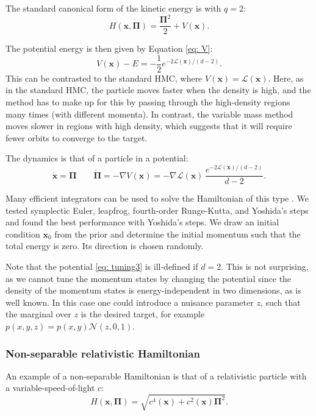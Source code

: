 \documentclass[twoside,11pt]{article}
\newcommand{\p}{\boldsymbol{\Pi}}
\newcommand{\x}{\boldsymbol{x}}
\begin{document}
The standard canonical form of the kinetic energy is with $q = 2$:
\begin{equation}\label{eq: H3}
    H(\x , \p) = \frac{\p^2}{2} + V(\x) .
\end{equation}

The potential energy is then given by Equation \eqref{eq: V}:
\begin{equation}\label{eq: tuning3}
    V(\x) - E = -\frac{1}{2} e^{- 2 \mathcal{L}(\x) / (d-2)}.
\end{equation}
This can be contrasted to the standard HMC, where $V(\x) = \mathcal{L}(\x)$. Here, as in the standard HMC, the particle moves faster when the density is high, and the method has to make up for this by passing through the high-density regions many times (with different momenta). In contrast, the variable mass 
method moves slower in regions with 
high density, which suggests 
that it will require fewer orbits 
to converge to the target. 

The dynamics is that of a particle in a potential:
\begin{equation}
    \dot{\x} = \p \qquad \dot{\p} = - \nabla V(\x) = - \nabla \mathcal{L}(\x) \, \frac{e^{- 2 \mathcal{L}(\x) / (d-2)}}{d-2}.
    \label{eq:standard}
\end{equation}

Many efficient integrators can be used to solve the Hamiltonian of this type \citep{GeometricNumericalIntegration, MolecularDynamics, SimulatingHamiltonianDynamics}. We tested symplectic Euler, leapfrog, fourth-order Runge-Kutta, and Yoshida's steps and found the best performance with Yoshida's steps. We draw an initial condition $\x_0$ from the prior and determine the initial momentum such that the total energy is zero. Its direction is chosen randomly.

Note that the potential \eqref{eq: tuning3} is ill-defined if $d = 2$. This is not surprising, as we cannot tune the momentum states by changing the potential since the density of the momentum states is energy-independent in two dimensions, as is well known. In this case one could introduce a nuisance parameter $z$, such that the marginal over $z$ is the desired target, for example  $p(x, y, z) = p(x, y) \mathcal{N}(z, 0, 1)$.


\subsubsection{Non-separable relativistic Hamiltonian} \label{sec: relativistic}
An example of a non-separable Hamiltonian is that of a relativistic particle with a variable-speed-of-light $c$:
\begin{equation} \label{eq: H2}
    H(\x, \p) = \sqrt{c^4(\x) + c^2(\x) \p^2} .
\end{equation}
\end{document}
